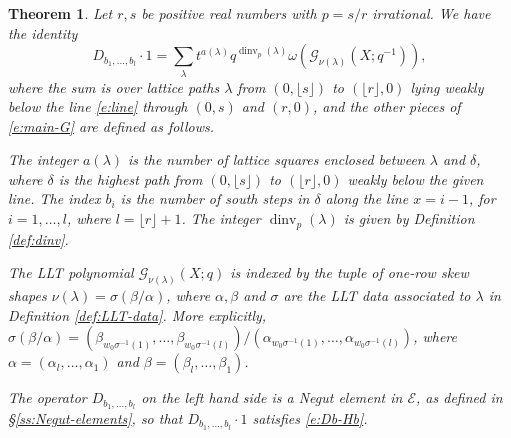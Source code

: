 \documentclass[12pt]{amsart}
\newtheorem{thm}{Theorem}[subsection]
\theoremstyle{definition}
\theoremstyle{remark}
\newcommand{\Ecal}{{\mathcal E}}
\newcommand{\Gcal}{{\mathcal G}}
\DeclareMathOperator{\dinv}{dinv}
\begin{document}
\begin{thm}\label{thm:main-G}
Let $r,s$ be positive real numbers with $p = s/r$ irrational.  We
have the identity
\begin{equation}\label{e:main-G}
D_{b_{1},\ldots,b_{l}} \cdot 1 = \sum _{\lambda } t^{a(\lambda )}
q^{\dinv _{p}(\lambda )} \omega (\Gcal_{\nu (\lambda )}(X;q^{-1})),
\end{equation}
where the sum is over lattice paths $\lambda $ from $(0,\lfloor s
\rfloor)$ to $(\lfloor r \rfloor,0)$ lying weakly below the line
\eqref{e:line} through $(0,s)$ and $(r,0)$, and the other pieces of
\eqref{e:main-G} are defined as follows.

The integer $a(\lambda )$ is the number of lattice squares enclosed
between $\lambda $ and $\delta $, where $\delta$ is the highest path from
$(0,\lfloor s\rfloor)$ to $(\lfloor r \rfloor,0)$ weakly below the
given line. The index $b_{i}$ is the number of south steps in $\delta
$ along the line $x = i-1$, for $i=1,\ldots,l$, where $l = \lfloor r
\rfloor+1$.  The integer $\dinv _{p}(\lambda )$ is given by Definition
\ref{def:dinv}.

The LLT polynomial $\Gcal_{\nu (\lambda )}(X;q)$ is indexed by the
tuple of one-row skew shapes $\nu (\lambda ) = \sigma (\beta /\alpha
)$, where $\alpha ,\beta $ and $\sigma $ are the LLT data associated
to $\lambda $ in Definition \ref{def:LLT-data}.  More explicitly,
$\sigma (\beta /\alpha ) = (\beta _{w_{0}\sigma^{-1}(1)},\ldots,\beta
_{w_{0}\sigma^{-1}(l)})/(\alpha_{w_{0}\sigma^{-1}(1)},\ldots,\alpha
_{w_{0}\sigma^{-1}(l)})$, where $\alpha =(\alpha _{l},\ldots,\alpha
_{1})$ and $\beta =(\beta _{l},\ldots,\beta _{1})$.

The operator $D_{b_{1},\ldots,b_{l}}$ on the left hand side is a Negut
element in $\Ecal $, as defined in \S \ref{ss:Negut-elements}, so that
$D_{b_{1},\ldots,b_{l}} \cdot 1$ satisfies \eqref{e:Db-Hb}.
\end{thm}
\end{document}
